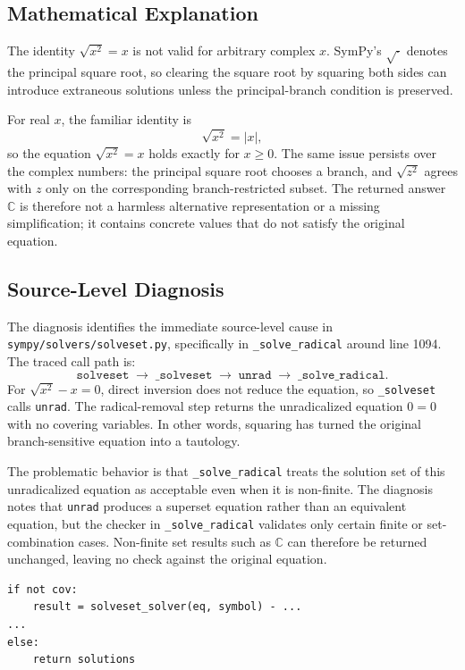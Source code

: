 \documentclass[11pt]{article}
\begin{document}
\subsection{Mathematical Explanation}

The identity \(\sqrt{x^2}=x\) is not valid for arbitrary complex \(x\). SymPy's \(\sqrt{\cdot}\) denotes the principal square root, so clearing the square root by squaring both sides can introduce extraneous solutions unless the principal-branch condition is preserved.

For real \(x\), the familiar identity is
\[
    \sqrt{x^2}=|x|,
\]
so the equation \(\sqrt{x^2}=x\) holds exactly for \(x\ge 0\). The same issue persists over the complex numbers: the principal square root chooses a branch, and \(\sqrt{z^2}\) agrees with \(z\) only on the corresponding branch-restricted subset. The returned answer \(\mathbb{C}\) is therefore not a harmless alternative representation or a missing simplification; it contains concrete values that do not satisfy the original equation.

\subsection{Source-Level Diagnosis}

The diagnosis identifies the immediate source-level cause in \nolinkurl{sympy/solvers/solveset.py}, specifically in \texttt{\_solve\_radical} around line 1094. The traced call path is:
\[
    \texttt{solveset}
    \;\to\;
    \texttt{\_solveset}
    \;\to\;
    \texttt{unrad}
    \;\to\;
    \texttt{\_solve\_radical}.
\]
For \(\sqrt{x^2}-x=0\), direct inversion does not reduce the equation, so \texttt{\_solveset} calls \texttt{unrad}. The radical-removal step returns the unradicalized equation \(0=0\) with no covering variables. In other words, squaring has turned the original branch-sensitive equation into a tautology.

The problematic behavior is that \texttt{\_solve\_radical} treats the solution set of this unradicalized equation as acceptable even when it is non-finite. The diagnosis notes that \texttt{unrad} produces a superset equation rather than an equivalent equation, but the checker in \texttt{\_solve\_radical} validates only certain finite or set-combination cases. Non-finite set results such as \(\mathbb{C}\) can therefore be returned unchanged, leaving no check against the original equation.

\begin{lstlisting}[style=bugpython]
if not cov:
    result = solveset_solver(eq, symbol) - ...
...
else:
    return solutions
\end{lstlisting}
\end{document}

